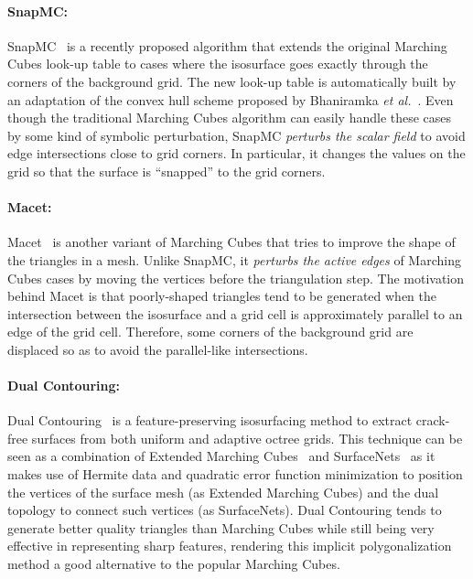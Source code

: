 \paragraph*{SnapMC:} SnapMC~\cite{Raman:2008:QIM} is a recently proposed algorithm
that extends the original Marching Cubes look-up table to cases where
the isosurface goes exactly through the corners of the background
grid.  The new look-up table is automatically built by an adaptation of
the convex hull scheme proposed by
Bhaniramka {\em et al.}~\cite{bhaniramka04}. Even though the traditional Marching
Cubes algorithm can easily handle these cases by some kind of symbolic
perturbation, SnapMC \emph{perturbs the scalar field} to avoid edge
intersections close to grid corners. In particular, it changes
the values on the grid so that the surface is ``snapped'' to the grid
corners.

\paragraph*{Macet:} Macet~\cite{Dietrich:TVCG:2008} is another variant of Marching
Cubes that tries to improve the shape of the triangles in a
mesh. Unlike SnapMC, it \emph{perturbs the active edges} of Marching Cubes
cases by moving the vertices before the triangulation step.  The
motivation behind Macet is that poorly-shaped triangles tend to be
generated when the intersection between the isosurface and a grid cell
is approximately parallel to an edge of the grid cell. Therefore, some
corners of the background grid are displaced so as to avoid the
parallel-like intersections.

\paragraph*{Dual Contouring:} Dual Contouring~\cite{Ju:2002:DCH:566654.566586} is a feature-preserving
isosurfacing method to extract crack-free surfaces from both uniform
and adaptive octree grids. This technique can be seen as a combination of
Extended Marching Cubes~\cite{kobbelt01} and SurfaceNets~\cite{gibson98} 
as it makes use of Hermite data and quadratic error function minimization 
to position the vertices of the surface mesh (as Extended Marching Cubes) 
and the dual topology to connect such vertices (as SurfaceNets).  Dual 
Contouring tends to generate better quality triangles than Marching Cubes 
while still being very effective in representing sharp features, rendering this
implicit polygonalization method a good alternative to the popular Marching Cubes.

